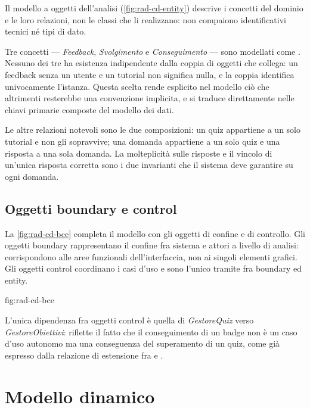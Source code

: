 Il modello a oggetti dell'analisi (\cref{fig:rad-cd-entity}) descrive i
concetti del dominio e le loro relazioni, non le classi che li realizzano:
non compaiono identificativi tecnici né tipi di dato.


Tre concetti — \emph{Feedback}, \emph{Svolgimento} e \emph{Conseguimento} —
sono modellati come . Nessuno dei tre ha
esistenza indipendente dalla coppia di oggetti che collega: un feedback senza
un utente e un tutorial non significa nulla, e la coppia identifica
univocamente l'istanza. Questa scelta rende esplicito nel modello ciò che
altrimenti resterebbe una convenzione implicita, e si traduce direttamente
nelle chiavi primarie composte del modello dei dati.

Le altre relazioni notevoli sono le due composizioni: un quiz appartiene a un
solo tutorial e non gli sopravvive; una domanda appartiene a un solo quiz e
una risposta a una sola domanda. La molteplicità  sulle risposte e
il vincolo di un'unica risposta corretta sono i due invarianti che il sistema
deve garantire su ogni domanda.

\subsection{Oggetti boundary e control}

La \cref{fig:rad-cd-bce} completa il modello con gli oggetti di confine e di
controllo. Gli oggetti boundary rappresentano il confine fra sistema e
attori a livello di analisi: corrispondono alle aree funzionali
dell'interfaccia, non ai singoli elementi grafici. Gli oggetti control
coordinano i casi d'uso e sono l'unico tramite fra boundary ed entity.

{fig:rad-cd-bce}

L'unica dipendenza fra oggetti control è quella di \emph{GestoreQuiz} verso
\emph{GestoreObiettivi}: riflette il fatto che il conseguimento di un badge
non è un caso d'uso autonomo ma una conseguenza del superamento di un quiz,
come già espresso dalla relazione di estensione fra  e
.

\section{Modello dinamico}
\label{sec:rad-dynamic}

